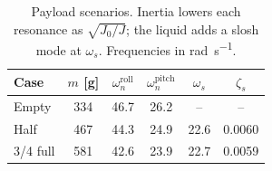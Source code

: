\begin{table}[!ht]
\centering
\caption{Payload scenarios. Inertia lowers each resonance as $\sqrt{J_0/J}$; the liquid adds a slosh mode at $\omega_s$. Frequencies in \si{\radian\per\second}.}
\label{tab:scenarios}
\setlength{\tabcolsep}{4pt}
\begin{tabular}{lccccc}
\toprule
Case & $m$ [\si{\gram}] & $\omega_n^{\mathrm{roll}}$ & $\omega_n^{\mathrm{pitch}}$ & $\omega_s$ & $\zeta_s$ \\
\midrule
Empty & 334 & 46.7 & 26.2 & -- & -- \\
Half & 467 & 44.3 & 24.9 & 22.6 & 0.0060 \\
3/4 full & 581 & 42.6 & 23.9 & 22.7 & 0.0059 \\
\bottomrule
\end{tabular}
\end{table}